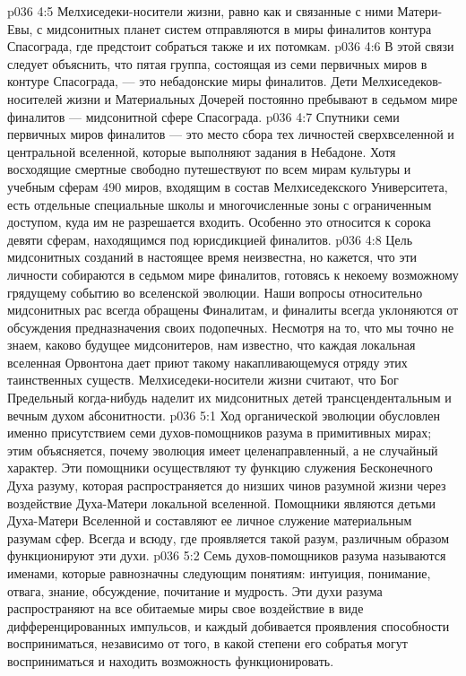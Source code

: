 \vs p036 4:5 \pc {} Мелхиседеки\hyp{}носители жизни, равно как и связанные с ними Матери\hyp{}Евы, с мидсонитных планет систем отправляются в миры финалитов контура Спасограда, где предстоит собраться также и их потомкам.
\vs p036 4:6 В этой связи следует объяснить, что пятая группа, состоящая из семи первичных миров в контуре Спасограда, --- это небадонские миры финалитов. Дети Мелхиседеков\hyp{}носителей жизни и Материальных Дочерей постоянно пребывают в седьмом мире финалитов --- мидсонитной сфере Спасограда.
\vs p036 4:7 Спутники семи первичных миров финалитов --- это место сбора тех личностей сверхвселенной и центральной вселенной, которые выполняют задания в Небадоне. Хотя восходящие смертные свободно путешествуют по всем мирам культуры и учебным сферам 490 миров, входящим в состав Мелхиседекского Университета, есть отдельные специальные школы и многочисленные зоны с ограниченным доступом, куда им не разрешается входить. Особенно это относится к сорока девяти сферам, находящимся под юрисдикцией финалитов.
\vs p036 4:8 \pc Цель мидсонитных созданий в настоящее время неизвестна, но кажется, что эти личности собираются в седьмом мире финалитов, готовясь к некоему возможному грядущему событию во вселенской эволюции. Наши вопросы относительно мидсонитных рас всегда обращены Финалитам, и финалиты всегда уклоняются от обсуждения предназначения своих подопечных. Несмотря на то, что мы точно не знаем, каково будущее мидсонитеров, нам известно, что каждая локальная вселенная Орвонтона дает приют такому накапливающемуся отряду этих таинственных существ. Мелхиседеки\hyp{}носители жизни считают, что Бог Предельный когда\hyp{}нибудь наделит их мидсонитных детей трансцендентальным и вечным духом абсонитности.
\vs p036 5:1 Ход органической эволюции обусловлен именно присутствием семи духов\hyp{}помощников разума в примитивных мирах; этим объясняется, почему эволюция имеет целенаправленный, а не случайный характер. Эти помощники осуществляют ту функцию служения Бесконечного Духа разуму, которая распространяется до низших чинов разумной жизни через воздействие Духа\hyp{}Матери локальной вселенной. Помощники являются детьми Духа\hyp{}Матери Вселенной и составляют ее личное служение материальным разумам сфер. Всегда и всюду, где проявляется такой разум, различным образом функционируют эти духи.
\vs p036 5:2 Семь духов\hyp{}помощников разума называются именами, которые равнозначны следующим понятиям: интуиция, понимание, отвага, знание, обсуждение, почитание и мудрость. Эти духи разума распространяют на все обитаемые миры свое воздействие в виде дифференцированных импульсов, и каждый добивается проявления способности восприниматься, независимо от того, в какой степени его собратья могут восприниматься и находить возможность функционировать.
